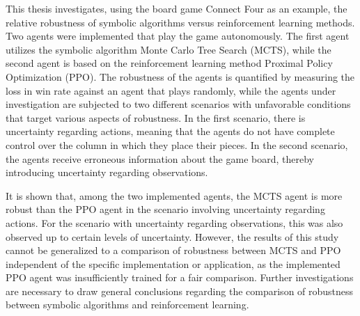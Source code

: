 This thesis investigates, using the board game Connect Four as an example, the relative robustness of symbolic algorithms versus reinforcement learning methods. Two agents were implemented that play the game autonomously. The first agent utilizes the symbolic algorithm Monte Carlo Tree Search (MCTS), while the second agent is based on the reinforcement learning method Proximal Policy Optimization (PPO). The robustness of the agents is quantified by measuring the loss in win rate against an agent that plays randomly, while the agents under investigation are subjected to two different scenarios with unfavorable conditions that target various aspects of robustness. In the first scenario, there is uncertainty regarding actions, meaning that the agents do not have complete control over the column in which they place their pieces. In the second scenario, the agents receive erroneous information about the game board, thereby introducing uncertainty regarding observations.

It is shown that, among the two implemented agents, the MCTS agent is more robust than the PPO agent in the scenario involving uncertainty regarding actions. For the scenario with uncertainty regarding observations, this was also observed up to certain levels of uncertainty. However, the results of this study cannot be generalized to a comparison of robustness between MCTS and PPO independent of the specific implementation or application, as the implemented PPO agent was insufficiently trained for a fair comparison. Further investigations are necessary to draw general conclusions regarding the comparison of robustness between symbolic algorithms and reinforcement learning.
